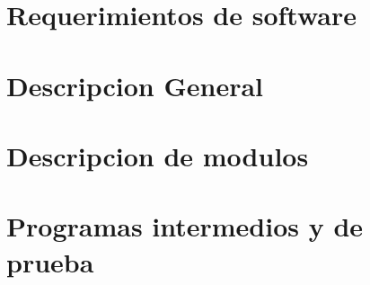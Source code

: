 


		
	
	\newpage

	\tableofcontents
	\newpage

	\graphicspath{{./report/pics/}}

	\section{Requerimientos de software}
		

	\newpage
	\section{Descripcion General}
		

	\newpage
	\section{Descripcion de modulos}
		

	\newpage
	\section{Programas intermedios y de prueba}
		


